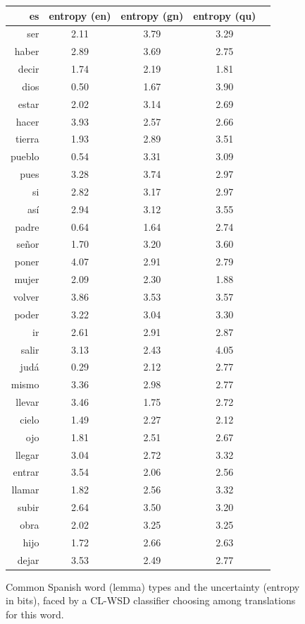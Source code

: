 \begin{figure}
  \begin{tiny}
  \begin{centering}
  \begin{tabular}{|r|c|c|c|c|}
    \hline
    es & entropy (en) & entropy (gn) & entropy (qu) \\
    \hline
ser    & 2.11 &  3.79  &  3.29  \\
haber  & 2.89 &  3.69  &  2.75  \\ 
decir  & 1.74 &  2.19  &  1.81  \\ 
dios   & 0.50 &  1.67  &  3.90  \\ 
estar  & 2.02 &  3.14  &  2.69  \\ 
hacer  & 3.93 &  2.57  &  2.66  \\ 
tierra & 1.93 &  2.89  &  3.51  \\ 
pueblo & 0.54 &  3.31  &  3.09  \\ 
pues   & 3.28 &  3.74  &  2.97  \\ 
si     & 2.82 &  3.17  &  2.97  \\ 
así    & 2.94 &  3.12  &  3.55  \\ 
padre  & 0.64 &  1.64  &  2.74  \\ 
señor  & 1.70 &  3.20  &  3.60  \\ 
poner  & 4.07 &  2.91  &  2.79  \\ 
mujer  & 2.09 &  2.30  &  1.88  \\ 
volver & 3.86 &  3.53  &  3.57  \\ 
poder  & 3.22 &  3.04  &  3.30  \\ 
ir     & 2.61 &  2.91  &  2.87  \\ 
salir  & 3.13 &  2.43  &  4.05  \\ 
judá   & 0.29 &  2.12  &  2.77  \\ 
mismo  & 3.36 &  2.98  &  2.77  \\ 
llevar & 3.46 &  1.75  &  2.72  \\ 
cielo  & 1.49 &  2.27  &  2.12  \\ 
ojo    & 1.81 &  2.51  &  2.67  \\ 
llegar & 3.04 &  2.72  &  3.32  \\ 
entrar & 3.54 &  2.06  &  2.56  \\ 
llamar & 1.82 &  2.56  &  3.32  \\ 
subir  & 2.64 &  3.50  &  3.20  \\ 
obra   & 2.02 &  3.25  &  3.25  \\ 
hijo   & 1.72 &  2.66  &  2.63  \\ 
dejar  & 3.53 &  2.49  &  2.77  \\ 
    \hline
  \end{tabular}
  \end{centering}
  \end{tiny}
  \caption{Common Spanish word (lemma) types and the uncertainty (entropy in
  bits), faced by a CL-WSD classifier choosing among translations for this
  word.} 
  \label{fig:mostcommon-es-entropy}
\end{figure}


